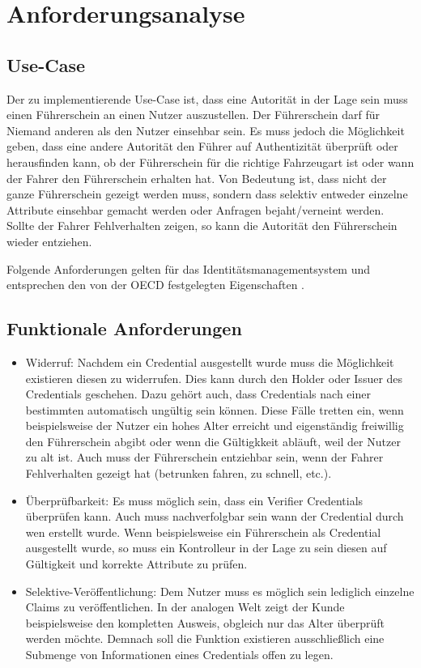 \chapter{Anforderungsanalyse}

\section{Use-Case}
Der zu implementierende Use-Case ist, dass eine Autorität in der Lage sein muss einen Führerschein an einen Nutzer auszustellen. Der Führerschein darf für Niemand anderen als den Nutzer einsehbar sein. Es muss jedoch die Möglichkeit geben, dass eine andere Autorität den Führer auf Authentizität überprüft oder herausfinden kann, ob der Führerschein für die richtige Fahrzeugart ist oder wann der Fahrer den Führerschein erhalten hat. Von Bedeutung ist, dass nicht der ganze Führerschein gezeigt werden muss, sondern dass selektiv entweder einzelne Attribute einsehbar gemacht werden oder Anfragen bejaht/verneint werden. Sollte der Fahrer Fehlverhalten zeigen, so kann die Autorität den Führerschein wieder entziehen.

\label{cha:anforderungsanalyse}
Folgende Anforderungen gelten für das Identitätsmanagementsystem und entsprechen den von der OECD festgelegten Eigenschaften \cite{ID25} \cite{ID26}.
\section{Funktionale Anforderungen}
\begin{itemize}
	\item Widerruf: Nachdem ein Credential ausgestellt wurde muss die Möglichkeit existieren diesen zu widerrufen. Dies kann durch den Holder oder Issuer des Credentials geschehen. Dazu gehört auch, dass Credentials nach einer bestimmten automatisch ungültig sein können. Diese Fälle tretten ein, wenn beispielsweise der Nutzer ein hohes Alter erreicht und eigenständig freiwillig den Führerschein abgibt oder wenn die Gültigkkeit abläuft, weil der Nutzer zu alt ist. Auch muss der Führerschein entziehbar sein, wenn der Fahrer Fehlverhalten gezeigt hat (betrunken fahren, zu schnell, etc.).
	\item Überprüfbarkeit: Es muss möglich sein, dass ein Verifier Credentials überprüfen kann. Auch muss nachverfolgbar sein wann der Credential durch wen erstellt wurde. Wenn beispielsweise ein Führerschein als Credential ausgestellt wurde, so muss ein Kontrolleur in der Lage zu sein diesen auf Gültigkeit und korrekte Attribute zu prüfen.
	\item Selektive-Veröffentlichung: Dem Nutzer muss es möglich sein lediglich einzelne Claims zu veröffentlichen. In der analogen Welt zeigt der Kunde beispielsweise den kompletten Ausweis, obgleich nur das Alter überprüft werden möchte. Demnach soll die Funktion existieren ausschließlich eine Submenge von Informationen eines Credentials offen zu legen.
\end{itemize}

